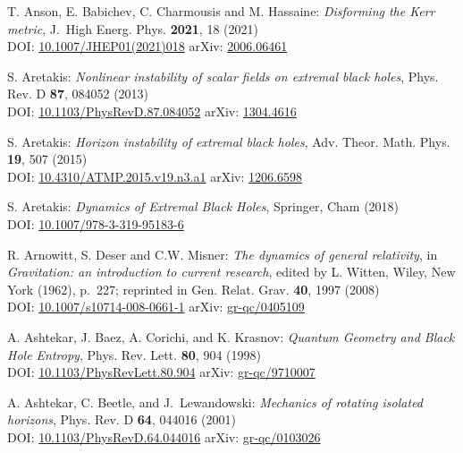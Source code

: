 \begin{thebibliography}{123}
T. Anson, E. Babichev, C. Charmousis and M. Hassaine:
{\em Disforming the Kerr metric},
J.~High Energ. Phys. {\bf 2021}, 18 (2021)\\
DOI: \href{https://doi.org/10.1007/JHEP01(2021)018}{10.1007/JHEP01(2021)018}\hfill
arXiv: \href{https://arxiv.org/abs/2006.06461}{2006.06461}

S. Aretakis:
{\em Nonlinear instability of scalar fields on extremal black holes},
Phys. Rev. D {\bf 87}, 084052 (2013)\\
DOI: \href{https://doi.org/10.1103/PhysRevD.87.084052}{10.1103/PhysRevD.87.084052}\hfill
arXiv: \href{https://arxiv.org/abs/1304.4616}{1304.4616}

S. Aretakis:
{\em Horizon instability of extremal black holes},
Adv. Theor. Math. Phys. {\bf 19}, 507 (2015)\\
DOI: \href{https://doi.org/10.4310/ATMP.2015.v19.n3.a1}{10.4310/ATMP.2015.v19.n3.a1}\hfill
arXiv: \href{https://arxiv.org/abs/1206.6598}{1206.6598}

S. Aretakis:
{\em Dynamics of Extremal Black Holes},
Springer, Cham (2018)\\
DOI: \href{https://doi.org/10.1007/978-3-319-95183-6}{10.1007/978-3-319-95183-6}

R. Arnowitt, S. Deser and C.W. Misner:
{\em The dynamics of general relativity},
in {\em Gravitation: an introduction to current research},
edited by L. Witten,
Wiley, New York (1962), p.~227; reprinted in
Gen. Relat. Grav. {\bf 40}, 1997 (2008)\\
DOI: \href{https://doi.org/10.1007/s10714-008-0661-1}{10.1007/s10714-008-0661-1}\hfill
arXiv: \href{https://arxiv.org/abs/gr-qc/0405109}{gr-qc/0405109}

A. Ashtekar, J. Baez, A. Corichi, and K. Krasnov:
{\em Quantum Geometry and Black Hole Entropy},
Phys. Rev. Lett. {\bf 80}, 904 (1998)\\
DOI: \href{https://doi.org/10.1103/PhysRevLett.80.904}{10.1103/PhysRevLett.80.904}\hfill
arXiv: \href{https://arxiv.org/abs/gr-qc/9710007}{gr-qc/9710007}

A. Ashtekar, C. Beetle, and J.~Lewandowski:
{\em Mechanics of rotating isolated horizons},
Phys. Rev. D {\bf 64}, 044016 (2001)\\
DOI: \href{https://doi.org/10.1103/PhysRevD.64.044016}{10.1103/PhysRevD.64.044016}\hfill
arXiv: \href{https://arxiv.org/abs/gr-qc/0103026}{gr-qc/0103026}


\end{thebibliography}
